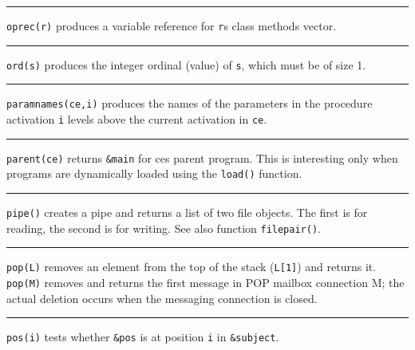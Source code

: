 \bigskip\hrule\vspace{0.1cm}

\noindent
\texttt{oprec(r)} produces a variable reference for
\texttt{r}{\textquotesingle}s class{\textquotesingle} methods vector.

\bigskip\hrule\vspace{0.1cm}

\noindent
{}\texttt{ord(s)} produces the integer ordinal
(value) of \texttt{s}, which must be of size 1.

\bigskip\hrule\vspace{0.1cm}

\noindent
{}\texttt{paramnames(ce,i)} produces the names of
the parameters in the procedure activation \texttt{i} levels above the
current activation in \texttt{ce}.

\bigskip\hrule\vspace{0.1cm}

\noindent
\texttt{parent(ce)} returns \texttt{\&main} for ce{\textquotesingle}s
parent program. This is interesting only when programs are dynamically
loaded using the \texttt{load()} function.

\bigskip\hrule\vspace{0.1cm}

\noindent
{}\texttt{pipe()} creates a pipe and returns a list of two
file objects. The first is for reading, the second is for writing. See
also function \texttt{filepair()}.

\bigskip\hrule\vspace{0.1cm}

\noindent
{}\texttt{pop(L)} removes an element from the top of the
stack (\texttt{L[1]}) and returns it. \texttt{pop(M)}
removes and returns the first message in POP mailbox connection M; the
actual deletion occurs when the messaging connection is closed.

\bigskip\hrule\vspace{0.1cm}

\noindent
{}\texttt{pos(i)} tests whether \texttt{\&pos} is at
position \texttt{i} in \texttt{\&subject}.

